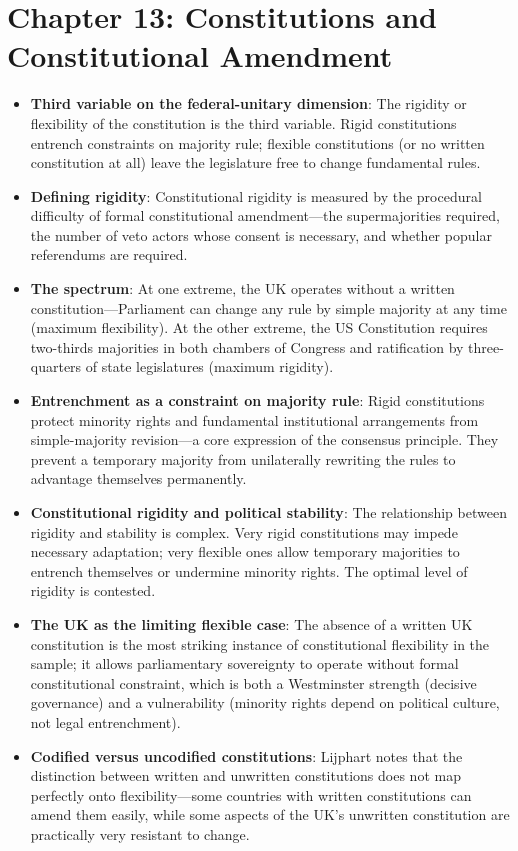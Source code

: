 \documentclass[12pt]{article}
\begin{document}
\section{Chapter 13: Constitutions and Constitutional Amendment}

\begin{itemize}[leftmargin=*, itemsep=4pt]
    \item \textbf{Third variable on the federal-unitary dimension}: The rigidity or flexibility of the constitution is the third variable. Rigid constitutions entrench constraints on majority rule; flexible constitutions (or no written constitution at all) leave the legislature free to change fundamental rules.
    \item \textbf{Defining rigidity}: Constitutional rigidity is measured by the procedural difficulty of formal constitutional amendment---the supermajorities required, the number of veto actors whose consent is necessary, and whether popular referendums are required.
    \item \textbf{The spectrum}: At one extreme, the UK operates without a written constitution---Parliament can change any rule by simple majority at any time (maximum flexibility). At the other extreme, the US Constitution requires two-thirds majorities in both chambers of Congress and ratification by three-quarters of state legislatures (maximum rigidity).
    \item \textbf{Entrenchment as a constraint on majority rule}: Rigid constitutions protect minority rights and fundamental institutional arrangements from simple-majority revision---a core expression of the consensus principle. They prevent a temporary majority from unilaterally rewriting the rules to advantage themselves permanently.
    \item \textbf{Constitutional rigidity and political stability}: The relationship between rigidity and stability is complex. Very rigid constitutions may impede necessary adaptation; very flexible ones allow temporary majorities to entrench themselves or undermine minority rights. The optimal level of rigidity is contested.
    \item \textbf{The UK as the limiting flexible case}: The absence of a written UK constitution is the most striking instance of constitutional flexibility in the sample; it allows parliamentary sovereignty to operate without formal constitutional constraint, which is both a Westminster strength (decisive governance) and a vulnerability (minority rights depend on political culture, not legal entrenchment).
    \item \textbf{Codified versus uncodified constitutions}: Lijphart notes that the distinction between written and unwritten constitutions does not map perfectly onto flexibility---some countries with written constitutions can amend them easily, while some aspects of the UK's unwritten constitution are practically very resistant to change.
\end{itemize}
\end{document}
